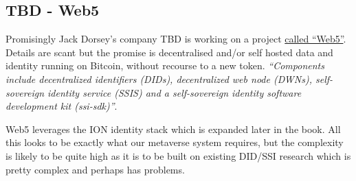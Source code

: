 \subsection{TBD - Web5}
Promisingly Jack Dorsey's company TBD is working on a project \href{https://developer.tbd.website/projects/web5/}{called ``Web5''}. Details are scant but the promise is decentralised and/or self hosted data and identity running on Bitcoin, without recourse to a new token. \textit{``Components include decentralized identifiers (DIDs), decentralized web node (DWNs), self-sovereign identity service (SSIS) and a self-sovereign identity software development kit (ssi-sdk)''}.\par
Web5 leverages the ION identity stack which is expanded later in the book. All this looks to be exactly what our metaverse system requires, but the complexity is likely to be quite high as it is to be built on existing DID/SSI research which is pretty complex and perhaps has problems.
